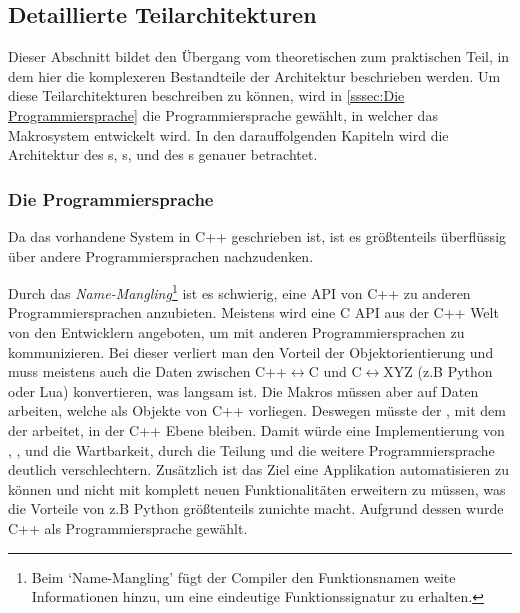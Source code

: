 {  %
  \subsection{Detaillierte Teilarchitekturen}
  \label{ssec:Detaillierte Teilarchitekturen}
    Dieser Abschnitt bildet den Übergang vom theoretischen zum praktischen Teil, in dem hier die komplexeren Bestandteile der Architektur beschrieben werden. Um diese Teilarchitekturen beschreiben zu können, wird in \autoref{sssec:Die Programmiersprache} die Programmiersprache gewählt, in welcher das Makrosystem entwickelt wird. In den darauffolgenden Kapiteln wird die Architektur des s, s,  und des s genauer betrachtet.

    \subsubsection{Die Programmiersprache}
    \label{sssec:Die Programmiersprache}
      Da das vorhandene System in C++ geschrieben ist, ist es größtenteils überflüssig über andere Programmiersprachen nachzudenken.

      Durch das \emph{Name-Mangling}\footnote{
        Beim `Name-Mangling' fügt der Compiler den Funktionsnamen weite Informationen hinzu, um eine eindeutige Funktionssignatur zu erhalten.
      } ist es schwierig, eine API von C++ zu anderen Programmiersprachen anzubieten. Meistens wird eine C API aus der C++ Welt von den Entwicklern angeboten, um mit anderen Programmiersprachen zu kommunizieren. Bei dieser verliert man den Vorteil der Objektorientierung und muss meistens auch die Daten zwischen C++$\longleftrightarrow$C und C$\longleftrightarrow$XYZ (z.B Python oder Lua) konvertieren, was langsam ist. Die Makros müssen aber auf Daten arbeiten, welche als Objekte von C++ vorliegen. Deswegen müsste der , mit dem der  arbeitet, in der C++ Ebene bleiben. Damit würde eine Implementierung von , ,  und  die Wartbarkeit, durch die Teilung und die weitere Programmiersprache deutlich verschlechtern. Zusätzlich ist das Ziel eine Applikation automatisieren zu können und nicht mit komplett neuen Funktionalitäten erweitern zu müssen, was die Vorteile von z.B Python größtenteils zunichte macht. Aufgrund dessen wurde C++ als Programmiersprache gewählt.

}
